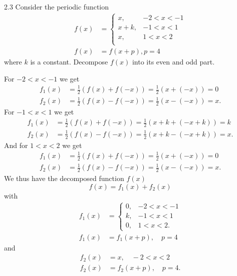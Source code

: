 \begin{problem}{2.3}
Consider the periodic function
\begin{align*}
  f(x) &= \begin{cases}
    x, & -2 < x < -1 \\
    x + k, & -1 < x < 1 \\
    x, & 1 < x < 2\\
  \end{cases} \\
    f(x) &= f(x+p), p = 4
\end{align*}
where $k$ is a constant. Decompose $f(x)$ into its even and odd part.
\end{problem}

\begin{derivation}
  For $-2 < x < -1$ we get
  \begin{align*}
    f_1(x) &= \frac{1}{2} \left( f(x) + f(-x) \right) = \frac{1}{2} (x + (-x)) = 0\\
    f_2(x) &= \frac{1}{2} \left( f(x) - f(-x) \right) = \frac{1}{2} (x - (-x)) = x
  .\end{align*}
  For $-1<x<1$ we get
  \begin{align*}
    f_1(x) &= \frac{1}{2} \left( f(x) + f(-x) \right) = \frac{1}{2} (x + k + (-x+k)) = k\\
    f_2(x) &= \frac{1}{2} \left( f(x) - f(-x) \right) = \frac{1}{2} \left( x + k - \left( -x + k \right) \right) = x
  .\end{align*}
  And for $1< x<2$ we get
  \begin{align*}
    f_1(x) &= \frac{1}{2} \left( f(x) + f(-x) \right) = \frac{1}{2} (x + (-x)) = 0\\
    f_2(x) &= \frac{1}{2} \left( f(x) - f(-x) \right) = \frac{1}{2} (x - (-x)) = x
  .\end{align*}
  We thus have the decomposed function $f(x)$
  \begin{equation*}
    f(x) = f_1(x) + f_2(x)
  \end{equation*}
  with
  \begin{align*}
    f_1 (x) &= \begin{cases}
      0, & -2<x< -1\\
    k, & -1<x<1 \\
    0, & 1<x<2
    .\end{cases} \\
    f_1(x) &= f_1(x+p), \quad p = 4
  \end{align*}
  and
  \begin{align*}
    f_2(x) &= x, \quad -2<x <2 \\
    f_2(x) &= f_2(x+p), \quad p=4
  .\end{align*}
\end{derivation}
